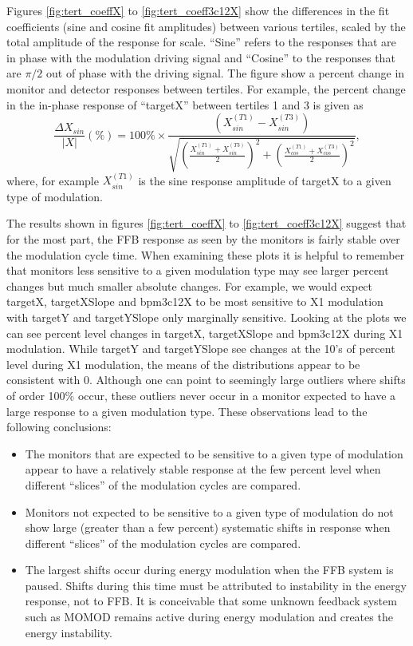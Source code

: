 Figures \ref{fig:tert_coeffX} to  \ref{fig:tert_coeff3c12X} show the differences in the fit coefficients (sine and cosine fit amplitudes) between various tertiles, scaled by the total amplitude of the response for scale. ``Sine'' refers to the responses that are in phase with the modulation driving signal and ``Cosine'' to the responses that are $\pi/2$ out of phase with the driving signal.  The figure show a percent change in monitor and detector responses between tertiles. For example, the percent change in the in-phase response of ``targetX'' between tertiles 1 and 3 is given as
\begin{equation}
\frac{\Delta X_{sin}}{|X|}(\%)=100\%\times\frac{(X_{sin}^{(T1)}-X_{sin}^{(T3)})}{\sqrt{ \left(\frac{X_{sin}^{(T1)}+X_{sin}^{(T3)}}{2}\right)^2+\left(\frac{X_{cos}^{(T1)}+X_{cos}^{(T3)}}{2}\right)^2}},
\label{eq:fractional_tertile_change}
\end{equation}
where, for example $X_{sin}^{(T1)}$ is the sine response amplitude of targetX to a given type of modulation.

The results shown in figures \ref{fig:tert_coeffX} to  \ref{fig:tert_coeff3c12X}
suggest that for the most part, the FFB response as seen by the monitors is fairly stable over the modulation cycle time. When examining these plots it is helpful to remember that monitors less sensitive to a given modulation type may see larger percent changes but much smaller absolute changes. For example, we would expect targetX, targetXSlope and bpm3c12X to be most sensitive to X1 modulation with targetY and targetYSlope only marginally sensitive. Looking at the plots we can see percent level changes in  targetX, targetXSlope and bpm3c12X during X1 modulation. While targetY and targetYSlope see changes at the 10's of percent level during X1 modulation, the means of the distributions appear to be consistent with 0. Although one can point to seemingly large outliers where shifts of order 100\% occur, these outliers never occur in a monitor expected to have a large response to a given modulation type. These observations lead to the following conclusions:
\begin{itemize}
\item{The monitors that are expected to be sensitive to a given type of modulation appear to have a relatively stable response at the few percent level when different ``slices'' of the modulation cycles are compared.}
\item{Monitors not expected to be sensitive to a given type of modulation do not show large (greater than a few percent) systematic shifts in response when different ``slices'' of the modulation cycles are compared.}
\item{The largest shifts occur during energy modulation when the FFB system is paused. Shifts during this time must be attributed to instability in the energy response, not to FFB. It is conceivable that some unknown feedback system such as MOMOD remains active during energy modulation and creates the energy instability.} 
\end{itemize}

